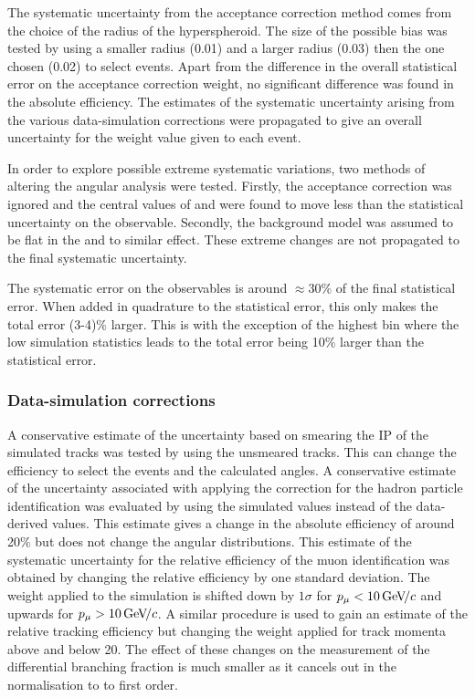 The systematic uncertainty from the acceptance correction method comes from the choice of the radius of the hyperspheroid.
The size of the possible bias was tested by using a smaller radius (0.01) and a larger radius (0.03) then the one chosen (0.02) to select events. 
Apart from the difference in the overall statistical error on the acceptance correction weight, no significant difference was found in the absolute efficiency.
The estimates of the systematic uncertainty arising from the various data-simulation corrections were propagated 
to give an overall uncertainty for the weight value given to each event.

In order to explore possible extreme systematic variations, two methods of altering the angular analysis were tested.
Firstly, the acceptance correction was ignored and the central values of \AFB and \FL 
 were found to move less than the statistical uncertainty on the observable. 
Secondly, the background model was assumed to be flat in the \ctl and \ctk to similar effect.
These extreme changes are not propagated to the final systematic uncertainty.

The systematic error on the observables is around $\approx30\%$ of the final statistical error.
When added in quadrature to the statistical error, this only makes the total error (3-4)\% larger.
This is with the exception of the highest \qsq bin where 
the low simulation statistics leads to the total error being 10\% larger than the statistical error.


\subsubsection{Data-simulation corrections}

A conservative estimate of the uncertainty based on smearing the IP of the simulated tracks was tested by using the unsmeared tracks.
This can change the efficiency to select the events and the calculated angles.
A conservative estimate of the uncertainty associated with applying the correction for the hadron particle identification
 was evaluated by using the simulated values instead of the data-derived values.
This estimate gives a change in the absolute efficiency of around 20\% but does not change the angular distributions.
This estimate of the systematic uncertainty for the relative efficiency of the muon identification was obtained by changing the relative efficiency by one standard deviation.
The weight applied to the simulation is shifted down by $1\sigma$ for $p_\mu < 10{\mathrm{\,Ge\kern -0.1em V\!/}c}$ and upwards for $p_\mu>10{\mathrm{\,Ge\kern -0.1em V\!/}c}$.
A similar procedure is used to gain an estimate of the relative tracking efficiency but changing the weight applied for track momenta above and below 20\gev.
The effect of these changes on the measurement of the differential branching fraction is much smaller as it cancels out in the normalisation to \BdToJpsiKstar to first order.

